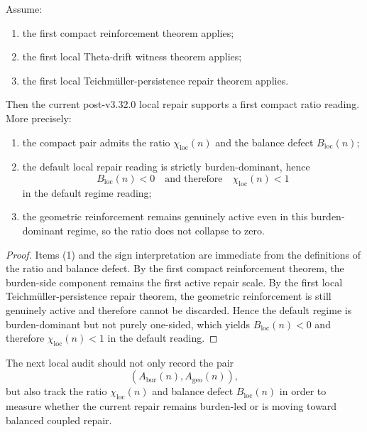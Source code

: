 \begin{theorem}
\label{thm:first-local-reinforcement-ratio-theorem}
Assume:
\begin{enumerate}[leftmargin=2em,label=(\alph*)]
  \item the first compact reinforcement theorem applies;
  \item the first local Theta-drift witness theorem applies;
  \item the first local Teichmüller-persistence repair theorem applies.
\end{enumerate}
Then the current post-v3.32.0 local repair supports a first compact ratio reading.
More precisely:
\begin{enumerate}[leftmargin=2em,label=(\arabic*)]
  \item the compact pair admits the ratio $\chi_{\mathrm{loc}}(n)$ and the balance defect $B_{\mathrm{loc}}(n)$;
  \item the default local repair reading is strictly burden-dominant, hence
  \[
    B_{\mathrm{loc}}(n)<0
    \quad\text{and therefore}\quad
    \chi_{\mathrm{loc}}(n)<1
  \]
  in the default regime reading;
  \item the geometric reinforcement remains genuinely active even in this burden-dominant regime, so the ratio does not collapse to zero.
\end{enumerate}
\end{theorem}

\begin{proof}
Items (1) and the sign interpretation are immediate from the definitions of the ratio and balance defect.
By the first compact reinforcement theorem, the burden-side component remains the first active repair scale.
By the first local Teichmüller-persistence repair theorem, the geometric reinforcement is still genuinely active and therefore cannot be discarded.
Hence the default regime is burden-dominant but not purely one-sided, which yields $B_{\mathrm{loc}}(n)<0$ and therefore $\chi_{\mathrm{loc}}(n)<1$ in the default reading.
\end{proof}

\begin{corollary}
\label{cor:current-compact-ratio-working-rule}
The next local audit should not only record the pair
\[
  (A_{\mathrm{bur}}(n),A_{\mathrm{geo}}(n)),
\]
but also track the ratio $\chi_{\mathrm{loc}}(n)$ and balance defect $B_{\mathrm{loc}}(n)$ in order to measure whether the current repair remains burden-led or is moving toward balanced coupled repair.
\end{corollary}

